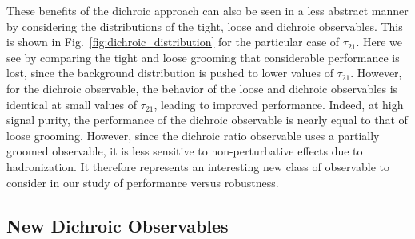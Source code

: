 \documentclass[11pt,letterpaper]{article}
\DeclareRobustCommand{\Fig}[1]{Fig.~\ref{#1}}
\begin{document}
These benefits of the dichroic approach can also be seen in a less abstract manner by considering the distributions of the tight, loose and dichroic observables. This is shown in \Fig{fig:dichroic_distribution} for the particular case of $\tau_{21}$. Here we see by comparing the tight and loose grooming that considerable performance is lost, since the background distribution is pushed to lower values of $\tau_{21}$. However, for the dichroic observable, the behavior of the loose and dichroic observables is identical at small values of $\tau_{21}$, leading to improved performance. Indeed, at high signal purity, the performance of the dichroic observable is nearly equal to that of loose grooming. However, since the dichroic ratio observable uses a partially groomed observable, it is less sensitive to non-perturbative effects due to hadronization.
%
It therefore represents an interesting new class of observable to consider in our study of performance versus robustness. 

\subsection{New Dichroic Observables}\label{sec:dichroic_new}
\end{document}
